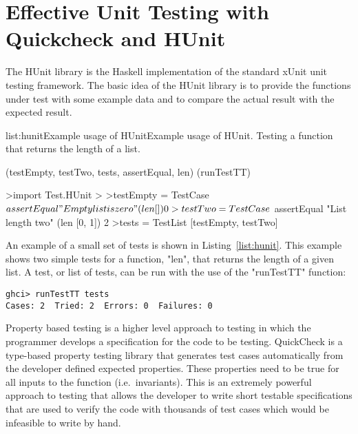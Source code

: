 \section{Effective Unit Testing with Quickcheck and HUnit}
\label{sec:testing}



The HUnit library is the Haskell implementation of the standard xUnit unit testing framework. The
basic idea of the HUnit library is to provide the functions under test with some example data
and to compare the actual result with the expected result.

\vspace{-0.5em}
\begin{listing}{list:hunit}{Example usage of HUnit}{Example usage of HUnit. Testing a function that returns the length of a list.}{}
\end{listing}\vspace{-1.5em}

\functions(testEmpty, testTwo, tests, assertEqual, len)
\functions(runTestTT)
\begin{haskell}
>import Test.HUnit
>
>testEmpty = TestCase $ assertEqual "Empty list is zero" (len []) 0
>testTwo = TestCase $ assertEqual "List length two" (len [0, 1]) 2
>tests = TestList [testEmpty, testTwo]

\end{haskell}
\noindent An example of a small set of tests is shown in Listing~\ref{list:hunit}. This example shows
two simple tests for a function, "len", that returns the length of a given list.
A test, or list of tests, can be run with the use of the "runTestTT" function:

\begin{verbatim}
ghci> runTestTT tests
Cases: 2  Tried: 2  Errors: 0  Failures: 0
\end{verbatim}


Property based testing is a higher level approach to testing in which the programmer develops a specification
for the code to be testing. QuickCheck is a type-based property testing library that generates test
cases automatically from the developer defined expected properties.\cite{claessen2000} These properties
need to be true for all inputs to the function (i.e.\ invariants). This is an extremely
powerful approach to testing that allows the developer to write short testable specifications that
are used to verify the code with thousands of test cases which would be infeasible to write by hand.

